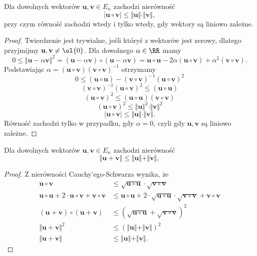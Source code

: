 \begin{theorem}
    Dla dowolnych wektorów $\mathbf{u}, \mathbf{v} \in E_n$ zachodzi nierówność
    \[ |\mathbf{u} \circ \mathbf{v}| \leq \Vert \mathbf{u} \Vert \cdot \Vert \mathbf{v} \Vert, \]
    przy czym równość zachodzi wtedy i tylko wtedy, gdy wektory są liniowo zależne.
\end{theorem}
\begin{proof}
    Twierdzenie jest trywialne, jeśli któryś z wektorów jest zerowy, dlatego przyjmijmy $\mathbf{u}, \mathbf{v} \neq \ol{0}$. Dla dowolnego $\alpha \in \RR$ mamy
    \[ 0 \leq \Vert\mathbf{u} - \alpha\mathbf{v}\Vert^2 = (\mathbf{u} - \alpha\mathbf{v}) \circ (\mathbf{u} - \alpha\mathbf{v}) = \mathbf{u} \circ \mathbf{u} - 2\alpha(\mathbf{u} \circ \mathbf{v}) + \alpha^2(\mathbf{v} \circ \mathbf{v}). \]
    Podstawiając $\alpha = (\mathbf{u} \circ \mathbf{v})(\mathbf{v} \circ \mathbf{v})^{-1}$ otrzymamy
    \[ 0 \leq (\mathbf{u} \circ \mathbf{u}) - (\mathbf{v} \circ \mathbf{v})^{-1}(\mathbf{u} \circ \mathbf{v})^2 \]
    \[ (\mathbf{v} \circ \mathbf{v})^{-1}(\mathbf{u} \circ \mathbf{v})^2 \leq (\mathbf{u} \circ \mathbf{u}) \]
    \[ (\mathbf{u} \circ \mathbf{v})^2 \leq (\mathbf{u} \circ \mathbf{u})(\mathbf{v} \circ \mathbf{v}) \]
    \[ (\mathbf{u} \circ \mathbf{v})^2 \leq \Vert \mathbf{u} \Vert^2 \cdot \Vert \mathbf{v} \Vert^2 \]
    \[ |\mathbf{u} \circ \mathbf{v}| \leq \Vert \mathbf{u} \Vert \cdot \Vert \mathbf{v} \Vert. \]
    Równość zachodzi tylko w przypadku, gdy $\alpha = 0$, czyli gdy $\mathbf{u}, \mathbf{v}$ są liniowo zależne.
\end{proof}

\begin{corollary}
    Dla dowolnych wektorów $\mathbf{u}, \mathbf{v} \in E_n$ zachodzi nierówność
    \[ \Vert \mathbf{u} + \mathbf{v} \Vert  \leq \Vert \mathbf{u} \Vert + \Vert \mathbf{v} \Vert, \]
\end{corollary}
\begin{proof}
    Z nierówności Cauchy'ego-Schwarza wynika, że
    \begin{align*}
        \mathbf{u} \circ \mathbf{v} &\leq \sqrt{\mathbf{u} \circ \mathbf{u}} \cdot \sqrt{\mathbf{v} \circ \mathbf{v}} \\
        \mathbf{u} \circ \mathbf{u} + 2 \cdot \mathbf{u} \circ \mathbf{v} + \mathbf{v} \circ \mathbf{v} &\leq \mathbf{u} \circ \mathbf{u} + 2 \cdot \sqrt{\mathbf{u} \circ \mathbf{u}} \cdot \sqrt{\mathbf{v} \circ \mathbf{v}} + \mathbf{v} \circ \mathbf{v} \\
        (\mathbf{u} + \mathbf{v}) \circ (\mathbf{u} + \mathbf{v}) &\leq (\sqrt{\mathbf{u} \circ \mathbf{u}} + \sqrt{\mathbf{v} \circ \mathbf{v}})^2 \\
        \Vert \mathbf{u} + \mathbf{v} \Vert^2  &\leq (\Vert \mathbf{u} \Vert + \Vert \mathbf{v} \Vert)^2 \\
        \Vert \mathbf{u} + \mathbf{v} \Vert  &\leq \Vert \mathbf{u} \Vert + \Vert \mathbf{v} \Vert.
    \end{align*}
\end{proof}

